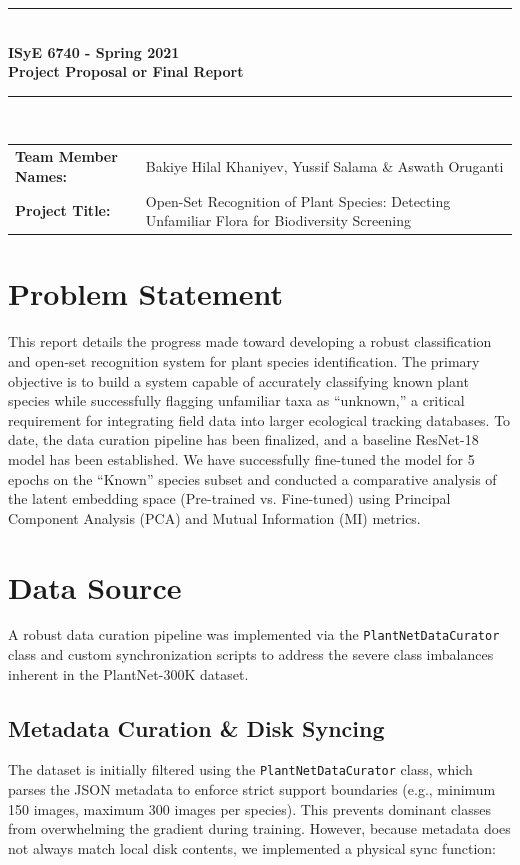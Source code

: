 \documentclass[twoside, 10pt]{article}
\begin{document}
\begin{titlepage}
\clearpage\thispagestyle{empty}
\centering
\vspace{1cm}
		
\rule{\linewidth}{1mm} \\[0.5cm]
{ \Large \bfseries ISyE 6740 - Spring 2021\\[0.2cm]Project Proposal or Final Report}\\[0.5cm]
\rule{\linewidth}{1mm} \\[1cm]
	
\begin{tabular}{@{}l p{7.5cm}@{}}
    \textbf{Team Member Names:} & Bakiye Hilal Khaniyev, Yussif Salama \& Aswath Oruganti \\[12pt]
    \textbf{Project Title:} & Open-Set Recognition of Plant Species: Detecting Unfamiliar Flora for Biodiversity Screening \\[12pt]
\end{tabular} 
	
\pagebreak

\end{titlepage}

\section{Problem Statement}
This report details the progress made toward developing a robust classification and open-set recognition system for plant species identification. The primary objective is to build a system capable of accurately classifying known plant species while successfully flagging unfamiliar taxa as ``unknown,'' a critical requirement for integrating field data into larger ecological tracking databases. 
To date, the data curation pipeline has been finalized, and a baseline ResNet-18 model has been established. We have successfully fine-tuned the model for 5 epochs on the ``Known'' species subset and conducted a comparative analysis of the latent embedding space (Pre-trained vs. Fine-tuned) using Principal Component Analysis (PCA) and Mutual Information (MI) metrics.

\section{Data Source}
A robust data curation pipeline was implemented via the \texttt{PlantNetDataCurator} class and custom synchronization scripts to address the severe class imbalances inherent in the PlantNet-300K dataset.
\subsection{Metadata Curation \& Disk Syncing}
The dataset is initially filtered using the \texttt{PlantNetDataCurator} class, which parses the JSON metadata to enforce strict support boundaries (e.g., minimum 150 images, maximum 300 images per species). This prevents dominant classes from overwhelming the gradient during training. 
However, because metadata does not always match local disk contents, we implemented a physical sync function:
\end{document}
